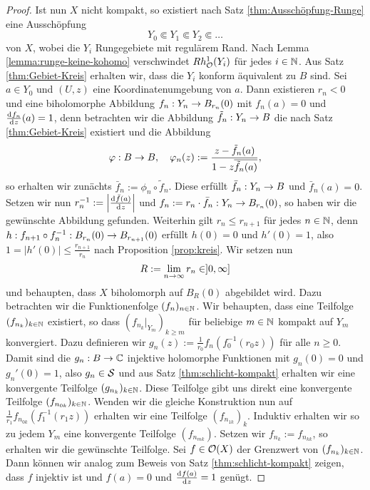 \begin{proof}
  Ist nun $X$ nicht kompakt, so existiert nach Satz \ref{thm:Ausschöpfung-Runge}
  eine Ausschöpfung
  \[
  Y_0 \Subset Y_1 \Subset Y_2 \Subset \dots
  \]
  von $X$, wobei die $Y_i$ Rungegebiete mit regulärem Rand. 
  Nach Lemma \ref{lemma:runge-keine-kohomo} verschwindet
  $Rh_{\hol}^1(Y_i)$ für jedes $i \in \N$.
  Aus Satz \ref{thm:Gebiet-Kreis} erhalten wir, dass die $Y_i$
  konform äquivalent zu $B$ sind. 
  Sei $a \in Y_0$ und $(U,z)$ eine Koordinatenumgebung von $a$. Dann
  existieren $r_n <0$ und eine biholomorphe Abbildung $f_n: Y_n \ra
  B_{r_n}(0)$ mit $f_n(a) = 0$ und $\frac{\d[f_n]}{\d[z]}(a) = 1$, denn
  betrachten wir die Abbildung $\tilde f_n : Y_n \ra B$ die nach
  Satz \ref{thm:Gebiet-Kreis} existiert und die Abbildung
  \[
  \phi: B \ra B, \quad\phi_n(z) := \frac{z- \tilde f_n(a)}{1 - z \overline{\tilde
      f_n(a)}},
  \]
  so erhalten wir zunächts $\bar f_n := \phi_n \circ \tilde
  f_n$. Diese erfüllt $\bar f_n : Y_n \ra B$ und $\bar f_n(a) =
  0$. Setzen wir nun $r_n^{-1} := \left | \frac{\d[\bar f(a)]}{\d[z]}
  \right |$ und $f_n := r_n \cdot \bar f_n : Y_n \ra B_{r_n}(0)$, so
  haben wir die gewünschte Abbildung gefunden. 
  Weiterhin gilt $r_n \leq r_{n+1}$ für jedes $n \in \N$, denn $h:
  f_{n+1} \circ f_n^{-1} : B_{r_n}(0) \ra B_{r_{n+1}}(0)$ erfüllt $h(0)=0$
  und $h'(0) = 1$, also $1 = |h'(0)| \leq \frac{r_{n+1}}{r_n}$ nach
  Proposition \ref{prop:kreis}. 
  Wir setzen nun
  \[
  R := \lim_{n \ra \infty} r_n \in ]0, \infty]
  \]
  und behaupten, dass $X$ biholomorph auf $B_R(0)$ abgebildet wird. Dazu
  betrachten wir die Funktionenfolge $(f_n)_{n \in \N}$. Wir
  behaupten, dass eine Teilfolge $(f_{n_k})_{k \in \N}$ existiert,
  so dass $(f_{n_k}|_{Y_m})_{k \geq m}$ für beliebige $m \in \N$
  kompakt auf $Y_m$ konvergiert. 
  Dazu definieren wir $g_n(z) := \frac{1}{r_0} f_n(f_0^{-1}(r_0 z))$
  für alle $n \geq 0$. Damit sind die $g_n : B \ra \C$ injektive
  holomorphe Funktionen mit $g_n(0) = 0$ und $g_n'(0) = 1$, also
  $g_n \in \S$ und aus Satz \ref{thm:schlicht-kompakt}
  erhalten wir eine konvergente Teilfolge $(g_{n_k})_{k \in\N}$.
  Diese Teilfolge gibt uns direkt eine konvergente Teilfolge
  $(f_{n_{0k}})_{k\in\N}$.
  Wenden wir die gleiche Konstruktion nun auf
  $\frac{1}{r_1}f_{n_{0k}}(f_1^{-1}(r_1z))$ erhalten wir eine
  Teilfolge $(f_{n_{1k}})_k$. Induktiv erhalten wir so zu jedem $Y_m$
  eine konvergente Teilfolge $(f_{n_{mk}})$. 
  Setzen wir $f_{n_k} := f_{n_{kk}}$, so erhalten wir die gewünschte
  Teilfolge.
  Sei $f \in \hol(X)$ der Grenzwert von $(f_{n_k})_{k \in \N}$. Dann
  können wir analog zum Beweis von Satz \ref{thm:schlicht-kompakt}
  zeigen, dass $f$ injektiv ist und $f(a) = 0$ und
  $\frac{\d[f(a)]}{\d[z]} = 1$ genügt. 


\end{proof}

